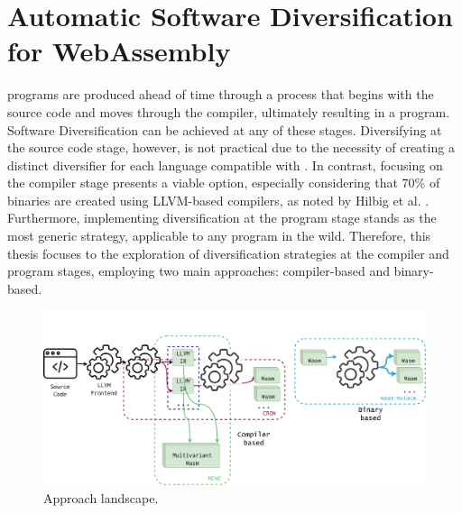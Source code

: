 \chapter{Automatic Software Diversification for WebAssembly}
\label{tech}




\Wasm programs are produced ahead of time through a process that begins with the source code and moves through the compiler, ultimately resulting in a \Wasm program. 
Software Diversification can be achieved at any of these stages. 
Diversifying at the source code stage, however, is not practical due to the necessity of creating a distinct diversifier for each language compatible with \Wasm. 
In contrast, focusing on the compiler stage presents a viable option, especially considering that 70\% of \Wasm binaries are created using LLVM-based compilers, as noted by Hilbig et al. \cite{Hilbig2021AnES}. 
Furthermore, implementing diversification at the \Wasm program stage stands as the most generic strategy, applicable to any \Wasm program in the wild. 
Therefore, this thesis focuses to the exploration of diversification strategies at the compiler and \Wasm program stages, employing two main approaches: compiler-based and binary-based.


\begin{figure}[h]
	\centering
	\includegraphics[width=1.0\textwidth]{figures/landscape.pdf}
	\caption{Approach landscape.}
	\label{fig:approach_landscape}
\end{figure}


